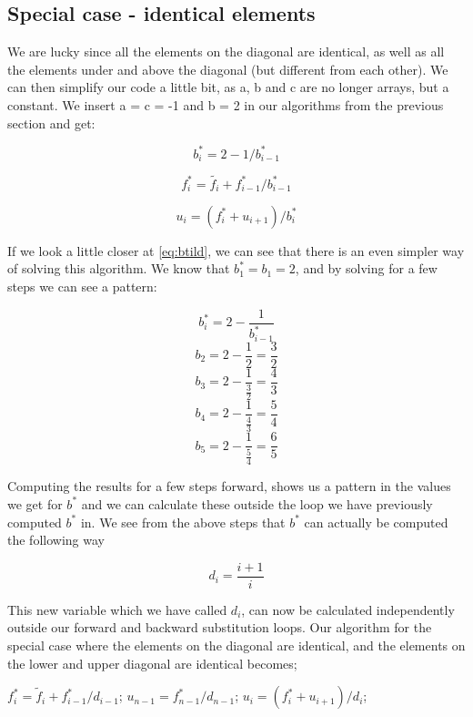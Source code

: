 \documentclass[oneside, final, 11pt, english, twocolumn]{article}
\begin{document}
\subsection{Special case - identical elements}

We are lucky since all the elements on the diagonal are identical, as well as all the elements under and above the diagonal (but different from each other). We can then simplify our code a little bit, as a, b and c are no longer arrays, but a constant. We insert a = c = -1 and b = 2 in our algorithms from the previous section and get: 

 
\begin{equation}
b_i^* = 2 - 1/b_{i-1}^*
\label{eq:btild}
\end{equation}

\begin{equation}
f^*_i = \tilde{f_i} + f_{i-1}^* / b_{i-1}^*
\end{equation}


\begin{equation}
u_i =  (f_i^* + u_{i+1})/b_i^*
\end{equation} 

If we look a little closer at \eqref{eq:btild}, we can see that there is an even simpler way of solving this algorithm. We know that $b_1^* = b_1 =  2$, and by solving for a few steps we can see a pattern:

\[b_i^* = 2 - \frac{1}{b_{i-1}^*} \]
\[b_2 = 2 - \frac{1}{2} = \frac{3}{2}\]
\[b_3 = 2 - \frac{1}{\frac{3}{2}} = \frac{4}{3}\]
\[b_4 = 2 - \frac{1}{\frac{4}{3}} = \frac{5}{4}\]
\[b_5 = 2 - \frac{1}{\frac{5}{4}} = \frac{6}{5}\]

Computing the results for a few steps forward, shows us a pattern in the values we get for $b^*$ and we can calculate these outside the loop we have previously computed $b^*$ in. We see from the above steps that $b^*$ can actually be computed the following way

\begin{equation}
d_i = \frac{i +1}{i}
\end{equation}

This new variable which we have called $d_i$, can now be calculated independently outside our forward and backward substitution loops. Our algorithm for the special case where the elements on the diagonal are identical, and the elements on the lower and upper diagonal are identical becomes; 


\begin{algorithmic}[H]
\State
{}
	\State $f^*_i = \tilde{f}_i + f^*_{i-1}/d_{i-1}$;
\EndFor
\State
\State $u_{n-1} = f^*_{n-1}/d_{n-1}$;
\State
{}
	\State $u_i = (f^*_i + u_{i+1})/ d_i$;
\EndFor
\State
\end{algorithmic}
\end{document}
